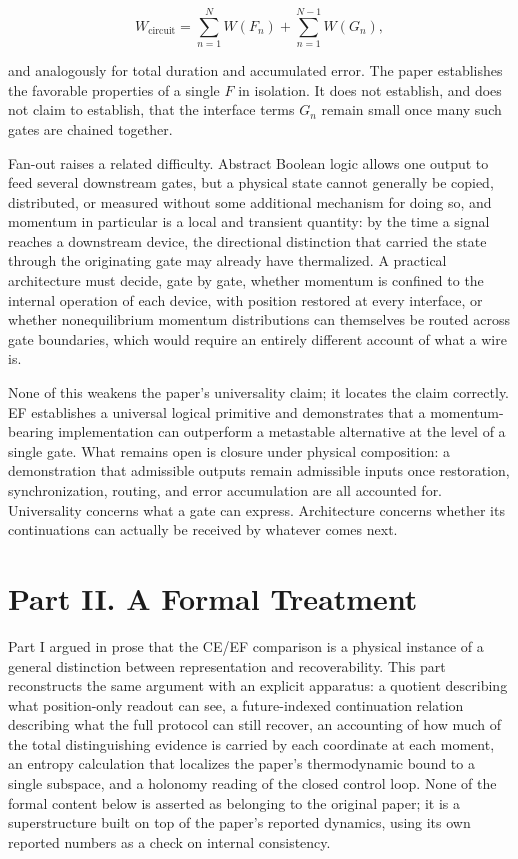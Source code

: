 \documentclass[11pt]{article}
\begin{document}
\[
W_{\mathrm{circuit}} = \sum_{n=1}^N W(F_n) + \sum_{n=1}^{N-1} W(G_n),
\]

and analogously for total duration and accumulated error. The paper establishes the favorable properties of a single $F$ in isolation. It does not establish, and does not claim to establish, that the interface terms $G_n$ remain small once many such gates are chained together.

Fan-out raises a related difficulty. Abstract Boolean logic allows one output to feed several downstream gates, but a physical state cannot generally be copied, distributed, or measured without some additional mechanism for doing so, and momentum in particular is a local and transient quantity: by the time a signal reaches a downstream device, the directional distinction that carried the state through the originating gate may already have thermalized. A practical architecture must decide, gate by gate, whether momentum is confined to the internal operation of each device, with position restored at every interface, or whether nonequilibrium momentum distributions can themselves be routed across gate boundaries, which would require an entirely different account of what a wire is.

None of this weakens the paper's universality claim; it locates the claim correctly. EF establishes a universal logical primitive and demonstrates that a momentum-bearing implementation can outperform a metastable alternative at the level of a single gate. What remains open is closure under physical composition: a demonstration that admissible outputs remain admissible inputs once restoration, synchronization, routing, and error accumulation are all accounted for. Universality concerns what a gate can express. Architecture concerns whether its continuations can actually be received by whatever comes next.

\part*{Part II. A Formal Treatment}

Part I argued in prose that the CE/EF comparison is a physical instance of a general distinction between representation and recoverability. This part reconstructs the same argument with an explicit apparatus: a quotient describing what position-only readout can see, a future-indexed continuation relation describing what the full protocol can still recover, an accounting of how much of the total distinguishing evidence is carried by each coordinate at each moment, an entropy calculation that localizes the paper's thermodynamic bound to a single subspace, and a holonomy reading of the closed control loop. None of the formal content below is asserted as belonging to the original paper; it is a superstructure built on top of the paper's reported dynamics, using its own reported numbers as a check on internal consistency.
\end{document}
